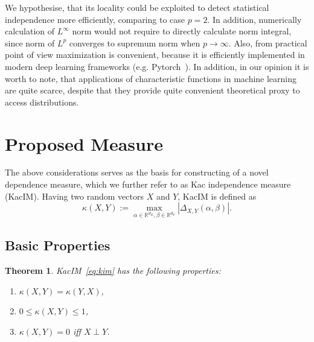 \documentclass{article}
\newtheorem{theorem}{Theorem}
\begin{document}
We hypothesise, that its locality could be exploited to detect statistical independence more efficiently, comparing to case $p=2$. 
In addition, numerically calculation of $L^{\infty} $ norm would not require to directly calculate norm integral, since norm of $L^{p}$ converges to supremum norm when $p \rightarrow \infty$. Also, from practical point of view maximization is convenient, because it is efficiently implemented in modern deep learning frameworks (e.g. Pytorch~\cite{NEURIPS2019_9015}). 
In addition, in our opinion it is worth to note, that applications of characteristic functions in machine learning are quite scarce, despite that they provide quite convenient theoretical proxy to access distributions.

\section{Proposed Measure}
\label{section:proposed_method}



\noindent The above considerations serves as the basis for constructing of a novel dependence measure, which we further refer to as Kac independence measure (KacIM). Having two random vectors $X$ and $Y$, KacIM is defined as
\begin{equation}
\label{eq:kim}
\kappa(X,Y):= \max_{\alpha \in \mathbb{R}^{d_{X}}, \beta \in \mathbb{R}^{d_{Y}}} |\Delta_{X,Y}(\alpha,\beta)|.
\end{equation}


\subsection{Basic Properties}
\begin{theorem}
	\label{thm:properties}
	KacIM~\eqref{eq:kim} has the following properties:
	\begin{enumerate} 
		\item $\kappa(X,Y) = \kappa(Y,X)$,
		\item $0 \leq \kappa(X,Y) \leq 1$,
		\item $\kappa(X,Y) = 0$ iff $X\perp Y$.
	\end{enumerate}    
\end{theorem}
\end{document}
